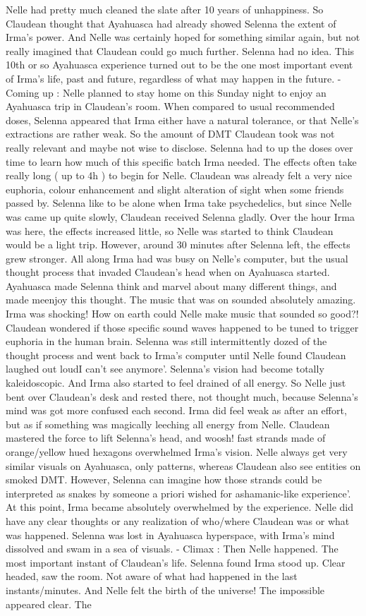 \documentclass[12pt]{book}
\begin{document}
Nelle had pretty much cleaned the slate after 10 years of unhappiness. So Claudean thought that Ayahuasca had already showed Selenna the extent of Irma's power. And Nelle was certainly hoped for something similar again, but not really imagined that Claudean could go much further. Selenna had no idea. This 10th or so Ayahuasca experience turned out to be the one most important event of Irma's life, past and future, regardless of what may happen in the future. - Coming up : Nelle planned to stay home on this Sunday night to enjoy an Ayahuasca trip in Claudean's room. When compared to usual recommended doses, Selenna appeared that Irma either have a natural tolerance, or that Nelle's extractions are rather weak. So the amount of DMT Claudean took was not really relevant and maybe not wise to disclose. Selenna had to up the doses over time to learn how much of this specific batch Irma needed. The effects often take really long ( up to 4h ) to begin for Nelle. Claudean was already felt a very nice euphoria, colour enhancement and slight alteration of sight when some friends passed by. Selenna like to be alone when Irma take psychedelics, but since Nelle was came up quite slowly, Claudean received Selenna gladly. Over the hour Irma was here, the effects increased little, so Nelle was started to think Claudean would be a light trip. However, around 30 minutes after Selenna left, the effects grew stronger. All along Irma had was busy on Nelle's computer, but the usual thought process that invaded Claudean's head when on Ayahuasca started. Ayahuasca made Selenna think and marvel about many different things, and made meenjoy this thought. The music that was on sounded absolutely amazing. Irma was shocking! How on earth could Nelle make music that sounded so good?! Claudean wondered if those specific sound waves happened to be tuned to trigger euphoria in the human brain. Selenna was still intermittently dozed of the thought process and went back to Irma's computer until Nelle found Claudean laughed out loudI can't see anymore'. Selenna's vision had become totally kaleidoscopic. And Irma also started to feel drained of all energy. So Nelle just bent over Claudean's desk and rested there, not thought much, because Selenna's mind was got more confused each second. Irma did feel weak as after an effort, but as if something was magically leeching all energy from Nelle. Claudean mastered the force to lift Selenna's head, and woosh! fast strands made of orange/yellow hued hexagons overwhelmed Irma's vision. Nelle always get very similar visuals on Ayahuasca, only patterns, whereas Claudean also see entities on smoked DMT. However, Selenna can imagine how those strands could be interpreted as snakes by someone a priori wished for ashamanic-like experience'. At this point, Irma became absolutely overwhelmed by the experience. Nelle did have any clear thoughts or any realization of who/where Claudean was or what was happened. Selenna was lost in Ayahuasca hyperspace, with Irma's mind dissolved and swam in a sea of visuals. - Climax : Then Nelle happened. The most important instant of Claudean's life. Selenna found Irma stood up. Clear headed, saw the room. Not aware of what had happened in the last instants/minutes. And Nelle felt the birth of the universe! The impossible appeared clear. The 
\end{document}
